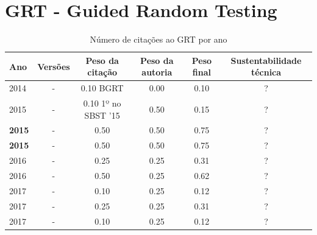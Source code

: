 \section{GRT - Guided Random Testing}



\begin{table}[H]
\caption{Número de citações ao GRT  por ano}
\centering
\begin{tabular}{| l | c | c | c | c | c |}
  \hline
  Ano & Versões & Peso da citação & Peso da autoria & Peso final & Sustentabilidade técnica \\
  \hline
            2014
          &
          -
          &
          0.10
            {\tiny BGRT}
          &
          0.00
          &
            {\color{red} 0.10}
          &
          ?
          \\
\hline
            2015
          &
          -
          &
          0.10
            {\tiny 1º no SBST '15}
          &
          0.50
          &
            {\color{red} 0.15}
          &
          ?
          \\
            {\bf 2015}
          &
          -
          &
          0.50
          &
          0.50
          &
            {\color{blue} 0.75}
          &
          ?
          \\
            {\bf 2015}
          &
          -
          &
          0.50
          &
          0.50
          &
            {\color{blue} 0.75}
          &
          ?
          \\
\hline
            2016
          &
          -
          &
          0.25
          &
          0.25
          &
            {\color{red} 0.31}
          &
          ?
          \\
            2016
          &
          -
          &
          0.50
          &
          0.25
          &
            {\color{blue} 0.62}
          &
          ?
          \\
\hline
            2017
          &
          -
          &
          0.10
          &
          0.25
          &
            {\color{red} 0.12}
          &
          ?
          \\
            2017
          &
          -
          &
          0.25
          &
          0.25
          &
            {\color{red} 0.31}
          &
          ?
          \\
            2017
          &
          -
          &
          0.10
          &
          0.25
          &
            {\color{red} 0.12}
          &
          ?
          \\
\hline
\end{tabular}
\end{table}



